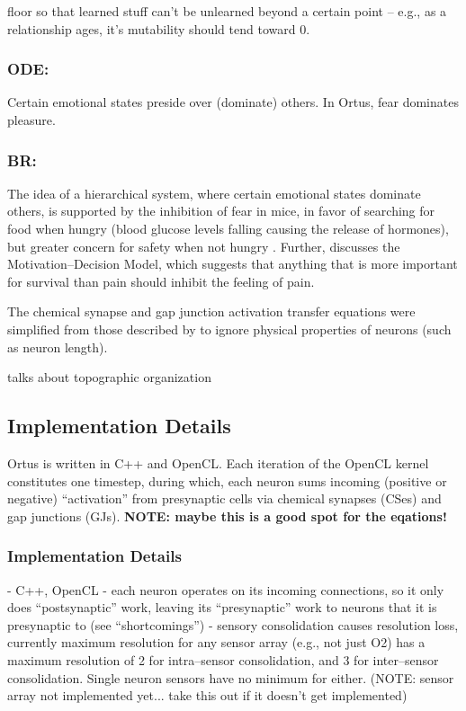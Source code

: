 \documentclass[letterpaper]{article}
\begin{document}
floor so that learned stuff can't be unlearned beyond a certain point -- e.g., as a relationship ages, it's mutability should tend toward 0.

\subsubsection{ODE:} Certain emotional states preside over (dominate) others. In Ortus, fear dominates pleasure.

\subsubsection{BR:} The idea of a hierarchical system, where certain emotional states dominate others, is supported by the inhibition of fear in mice, in favor of searching for food when hungry (blood glucose levels falling causing the release of hormones), but greater concern for safety when not hungry \citep{Verma2015}. Further, \citet{Leknes2008} discusses the Motivation--Decision Model, which suggests that anything that is more important for survival than pain should inhibit the feeling of pain.

The chemical synapse and gap junction activation transfer equations were simplified from those described by \cite{Wicks1996} to ignore physical properties of neurons (such as neuron length).


\cite{wiredforbehaviors} talks about topographic organization

\subsection{Implementation Details} Ortus is written in C++ and OpenCL. Each iteration of the OpenCL kernel constitutes one timestep, during which, each neuron sums incoming (positive or negative) ``activation'' from presynaptic cells via chemical synapses (CSes) and gap junctions (GJs).  \textbf{NOTE: maybe this is a good spot for the eqations!}




% 


\subsubsection{Implementation Details}
- C++, OpenCL
- each neuron operates on its incoming connections, so it only does ``postsynaptic'' work, leaving its ``presynaptic'' work to neurons that it is presynaptic to (see ``shortcomings'')
- sensory consolidation causes resolution loss, currently maximum resolution for any sensor array (e.g., not just O2) has a maximum resolution of 2 for intra--sensor consolidation, and 3 for inter--sensor consolidation. Single neuron sensors have no minimum for either. (NOTE: sensor array not implemented yet... take this out if it doesn't get implemented)
\end{document}

